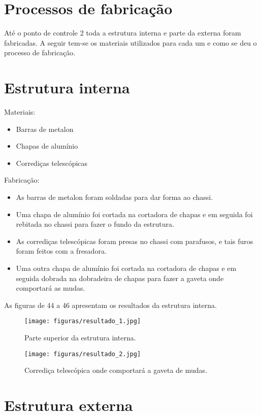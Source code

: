 \section{Processos de fabricação}

Até o ponto de controle 2 toda a estrutura interna e parte da externa foram fabricadas. A seguir tem-se os materiais utilizados para cada um e como se deu o processo de fabricação.

\section{Estrutura interna}

Materiais:
\begin{itemize}
	\item	Barras de metalon
	\item	Chapas de alumínio
	\item	Corrediças telescópicas
\end{itemize}

Fabricação:
\begin{itemize}
	\item	As barras de metalon foram soldadas para dar forma ao chassi.
	\item	Uma chapa de alumínio foi cortada na cortadora de chapas e em seguida foi rebitada no chassi para fazer o fundo da estrutura.
	\item	As corrediças telescópicas foram presas no chassi com parafusos, e tais furos foram feitos com a fresadora.
	\item	Uma outra chapa de alumínio foi cortada na cortadora de chapas e em seguida dobrada na dobradeira de chapas para fazer a gaveta onde comportará as mudas.
\end{itemize}

As figuras de 44 a 46 apresentam os resultados da estrutura interna.

\begin{figure}[H]
	\centering
	\texttt{[image: figuras/resultado\_1.jpg]}
	\caption{Parte superior da estrutura interna.} \label{resultado_1}
\end{figure}

\begin{figure}[H]
	\centering
	\texttt{[image: figuras/resultado\_2.jpg]}
	\caption{Corrediça telescópica onde comportará a gaveta de mudas.} \label{resultado_2}
\end{figure}

\section{Estrutura externa}

